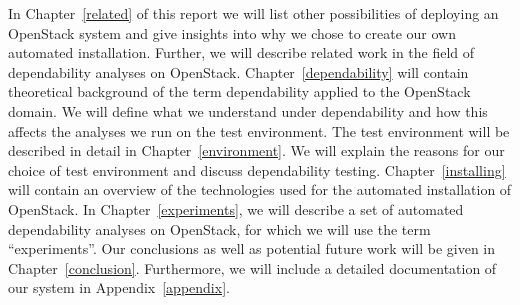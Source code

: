 In Chapter~\ref{related} of this report we will list other possibilities of deploying an OpenStack system and give insights into why we chose to create our own automated installation. Further, we will describe related work in the field of dependability analyses on OpenStack. Chapter~\ref{dependability} will contain theoretical background of the term dependability applied to the OpenStack domain. We will define what we understand under dependability and how this affects the analyses we run on the test environment. The test environment will be described in detail in Chapter~\ref{environment}. We will explain the reasons for our choice of test environment and discuss dependability testing. Chapter~\ref{installing} will contain an overview of the technologies used for the automated installation of OpenStack. In Chapter~\ref{experiments}, we will describe a set of automated dependability analyses on OpenStack, for which we will use the term ``experiments''. Our conclusions as well as potential future work will be given in Chapter~\ref{conclusion}. Furthermore, we will include a detailed documentation of our system in Appendix~\ref{appendix}. \\